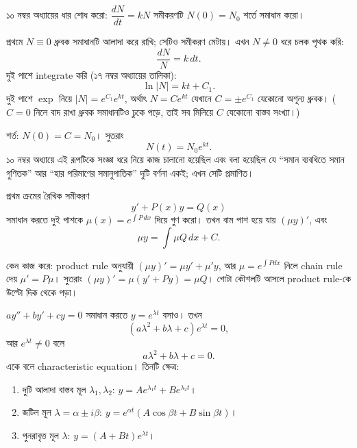 \documentclass[11pt]{article}
\begin{document}
\begin{example}
১০ নম্বর অধ্যায়ের ধার শোধ করো: $\dfrac{dN}{dt} = kN$ সমীকরণটি
$N(0) = N_{0}$ শর্তে সমাধান করো।
\end{example}

\begin{solbox}
প্রথমে $N \equiv 0$ ধ্রুবক সমাধানটি আলাদা করে রাখি; সেটিও সমীকরণ মেটায়।
এখন $N \neq 0$ ধরে চলক পৃথক করি:
\[
  \frac{dN}{N} = k\,dt .
\]
দুই পাশে integrate করি (১৭ নম্বর অধ্যায়ের তালিকা):
\[
  \ln|N| = kt + C_{1} .
\]
দুই পাশে $\exp$ নিয়ে $|N| = e^{C_{1}}e^{kt}$, অর্থাৎ $N = Ce^{kt}$ যেখানে
$C = \pm e^{C_{1}}$ যেকোনো অশূন্য ধ্রুবক। ($C = 0$ নিলে বাদ রাখা ধ্রুবক
সমাধানটিও ঢুকে পড়ে, তাই সব মিলিয়ে $C$ যেকোনো বাস্তব সংখ্যা।)

শর্ত: $N(0) = C = N_{0}$। সুতরাং
\[
  N(t) = N_{0}e^{kt} .
\]
১০ নম্বর অধ্যায়ে এই রূপটিকে সংজ্ঞা ধরে নিয়ে কাজ চালানো হয়েছিল এবং বলা
হয়েছিল যে ``সমান ব্যবধিতে সমান গুণিতক'' আর ``হার পরিমাণের সমানুপাতিক'' দুটি
বর্ণনা একই; এখন সেটি প্রমাণিত।
\end{solbox}

\begin{idea}
প্রথম ক্রমের রৈখিক সমীকরণ
\[
  y' + P(x)y = Q(x)
\]
সমাধান করতে দুই পাশকে $\mu(x) = e^{\int P\,dx}$ দিয়ে গুণ করো। তখন বাম পাশ
হয়ে যায় $\left( \mu y \right)'$, এবং
\[
  \mu y = \int \mu Q\,dx + C .
\]
\end{idea}

কেন কাজ করে: product rule অনুযায়ী $(\mu y)' = \mu y' + \mu' y$, আর
$\mu = e^{\int P dx}$ নিলে chain rule দেয় $\mu' = P\mu$। সুতরাং
$(\mu y)' = \mu\left( y' + Py \right) = \mu Q$। গোটা কৌশলটি আসলে product
rule-কে উল্টো দিক থেকে পড়া।

\begin{idea}[কৌশল ৩: ধ্রুবক সহগের দ্বিতীয় ক্রম]
$ay'' + by' + cy = 0$ সমাধান করতে $y = e^{\lambda t}$ বসাও। তখন
\[
  \left( a\lambda^{2} + b\lambda + c \right)e^{\lambda t} = 0 ,
\]
আর $e^{\lambda t} \neq 0$ বলে
\[
  a\lambda^{2} + b\lambda + c = 0 .
\]
একে বলে characteristic equation। তিনটি ক্ষেত্র:
\begin{enumerate}
  \item দুটি আলাদা বাস্তব মূল $\lambda_{1}, \lambda_{2}$:
        $y = Ae^{\lambda_{1}t} + Be^{\lambda_{2}t}$।
  \item জটিল মূল $\lambda = \alpha \pm i\beta$:
        $y = e^{\alpha t}\left( A\cos\beta t + B\sin\beta t \right)$।
  \item পুনরাবৃত্ত মূল $\lambda$:
        $y = \left( A + Bt \right)e^{\lambda t}$।
\end{enumerate}
\end{idea}
\end{document}
